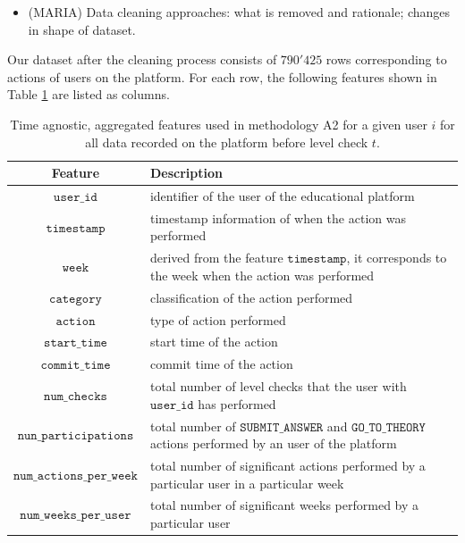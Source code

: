 \documentclass[sigplan,screen]{acmart}
\begin{document}
{\color{red}
\begin{itemize}
    \item (MARIA) Data cleaning approaches: what is removed and rationale; changes in shape of dataset.
\end{itemize}
}

Our dataset after the cleaning process consists of $790'425$ rows corresponding to actions of users on the platform. For each row, the following features shown in Table \ref{tab:features} are listed as columns.

\begin{table}[!ht]
  \caption{Time agnostic, aggregated features used in methodology A2 for a given user $i$ for all data recorded on the platform before level check $t$.}
  \label{tab:features}
  \begin{tabular}{cl}
    \toprule
    \textbf{Feature}&\textbf{Description}\\
    \midrule
    $\texttt{user\_id}$ & identifier of the user of the educational platform \\
    $\texttt{timestamp}$ & timestamp information of when the action was performed \\
    $\texttt{week}$ & derived from the feature $\texttt{timestamp}$, it corresponds to the week when the action was performed \\
    $\texttt{category}$ & classification of the action performed \\
    $\texttt{action}$ & type of action performed \\
    $\texttt{start\_time}$ & start time of the action \\
    $\texttt{commit\_time}$ & commit time of the action \\
    $\texttt{num\_checks}$ & total number of level checks that the user with $\texttt{user\_id}$ has performed \\
    $\texttt{nun\_participations}$ & total number of $\texttt{SUBMIT\_ANSWER}$ and $\texttt{GO\_TO\_THEORY}$ actions performed by an user of the platform \\
    $\texttt{num\_actions\_per\_week}$ & total number of significant actions performed by a particular user in a particular week \\
    $\texttt{num\_weeks\_per\_user}$ & total number of significant weeks performed by a particular user \\
    \bottomrule
    \end{tabular}
\end{table}
\end{document}
